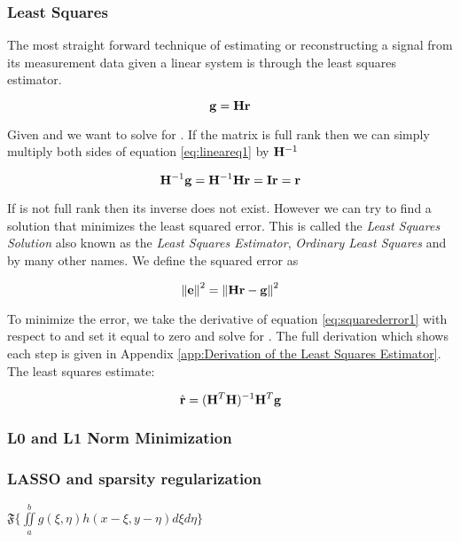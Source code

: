 \subsubsection{Least Squares}

The most straight forward technique of estimating or reconstructing a signal from its measurement data given a linear system is through the least squares estimator. 


\begin{equation}\label{eq:lineareq1}
	\mathbf{g} = \mathbf{Hr} 
\end{equation}

Given  and  we want to solve for . If the matrix is full rank then we can simply multiply both sides of equation \ref{eq:lineareq1} by $\mathbf{H}^{-1}$ 

\begin{equation}
	\mathbf{H}^{-1} \mathbf{g} = \mathbf{H}^{-1} \mathbf{Hr} = \mathbf{I} \mathbf{r} = \mathbf{r}
\end{equation}

If  is not full rank then its inverse does not exist. However we can try to find a solution  that minimizes the least squared error. This is called the \emph{Least Squares Solution} also known as the \emph{Least Squares Estimator}, \emph{Ordinary Least Squares} and by many other names. We define the squared error as

\begin{equation}\label{eq:squarederror1}
	\mathbf{ \lVert \mathbf{e} \rVert }^2 =    \mathbf{ \lVert \mathbf{Hr-g} \rVert }^2
\end{equation}

\noindent To minimize the error, we take the derivative of equation \ref{eq:squarederror1} with respect to  and set it equal to zero and solve for . The full derivation which shows each step is given in Appendix \ref{app:Derivation of the Least Squares Estimator}. The least squares estimate:

\begin{equation}
	\hat{ \mathbf{r} } = ( \mathbf{H}^T \mathbf{H} )^{-1} \mathbf{H}^T \mathbf{g}
\end{equation}

\subsubsection{L0 and L1 Norm Minimization}

\subsubsection{LASSO and sparsity regularization}

$  \mathfrak{F} \{ \iint\limits_{a}^{b}  g( \xi, \eta )  h( x - \xi, y - \eta )  d \xi d \eta \}  $

%  
%



